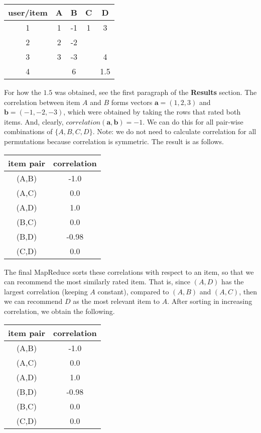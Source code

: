 \documentclass{article}
\begin{document}
\begin{center}
\begin{tabular}{|c|cccc|}
\hline
user/item & A & B & C & D\\
\hline
1 & 1 & -1 & 1 & 3\\
2 & 2 & -2 &  & \\
3 & 3 & -3 &  & 4\\
4 &  & 6 &  & 1.5\\
\hline
\end{tabular}
\end{center}

For how the $1.5$ was obtained, see the first paragraph of the \textbf{Results} section. The correlation between item $A$ and $B$ forms vectors $\textbf{a}=(1, 2, 3)$ and $\textbf{b}=(-1,- 2, -3)$, which were obtained by taking the rows that rated both items. And, clearly, $correlation(\textbf{a}, \textbf{b})=-1$. We can do this for all pair-wise combinations of $\{A, B, C, D\}$. Note: we do not need to calculate correlation for all permutations because correlation is symmetric. The result is as follows.

\begin{center}
\begin{tabular}{|c|c|}
\hline
item pair & correlation\\
\hline
(A,B) & -1.0\\
(A,C) & 0.0\\
(A,D) & 1.0\\
(B,C) & 0.0\\
(B,D) & -0.98\\
(C,D) & 0.0\\
\hline
\end{tabular}
\end{center}

The final MapReduce sorts these correlations with respect to an item, so that we can recommend the most similarly rated item. That is, since $(A,D)$ has the largest correlation (keeping $A$ constant), compared to $(A,B)$ and $(A,C)$, then we can recommend $D$ as the most relevant item to $A$. After sorting in increasing correlation, we obtain the following.

\begin{center}
\begin{tabular}{|c|c|}
\hline
item pair & correlation\\
\hline
(A,B) & -1.0\\
(A,C) & 0.0\\
(A,D) & 1.0\\
(B,D) & -0.98\\
(B,C) & 0.0\\
(C,D) & 0.0\\
\hline
\end{tabular}
\end{center}
\end{document}
